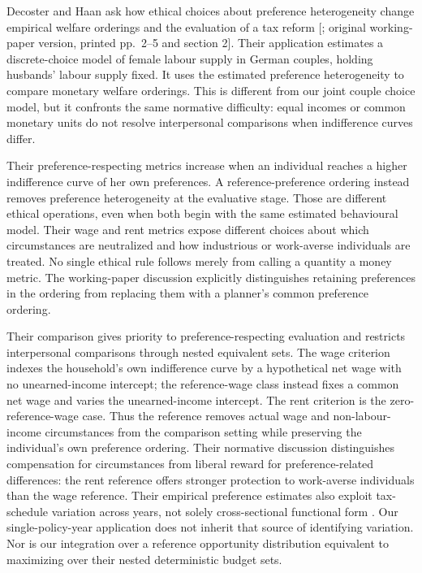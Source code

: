 \documentclass[11pt,a4paper]{article}
\begin{document}
Decoster and Haan ask how ethical choices about preference heterogeneity change empirical welfare orderings and the evaluation of a tax reform {[}\citet{decosterhaan2015}; original working-paper version, printed pp.~2--5 and section 2{]}. Their application estimates a discrete-choice model of female labour supply in German couples, holding husbands' labour supply fixed. It uses the estimated preference heterogeneity to compare monetary welfare orderings. This is different from our joint couple choice model, but it confronts the same normative difficulty: equal incomes or common monetary units do not resolve interpersonal comparisons when indifference curves differ.

Their preference-respecting metrics increase when an individual reaches a higher indifference curve of her own preferences. A reference-preference ordering instead removes preference heterogeneity at the evaluative stage. Those are different ethical operations, even when both begin with the same estimated behavioural model. Their wage and rent metrics expose different choices about which circumstances are neutralized and how industrious or work-averse individuals are treated. No single ethical rule follows merely from calling a quantity a money metric. The working-paper discussion explicitly distinguishes retaining preferences in the ordering from replacing them with a planner's common preference ordering.

Their comparison gives priority to preference-respecting evaluation and restricts interpersonal comparisons through nested equivalent sets. The wage criterion indexes the household's own indifference curve by a hypothetical net wage with no unearned-income intercept; the reference-wage class instead fixes a common net wage and varies the unearned-income intercept. The rent criterion is the zero-reference-wage case. Thus the reference removes actual wage and non-labour-income circumstances from the comparison setting while preserving the individual's own preference ordering. Their normative discussion distinguishes compensation for circumstances from liberal reward for preference-related differences: the rent reference offers stronger protection to work-averse individuals than the wage reference. Their empirical preference estimates also exploit tax-schedule variation across years, not solely cross-sectional functional form \citep[original working-paper version, printed pp.~7--11]{decosterhaan2015}. Our single-policy-year application does not inherit that source of identifying variation. Nor is our integration over a reference opportunity distribution equivalent to maximizing over their nested deterministic budget sets.
\end{document}
